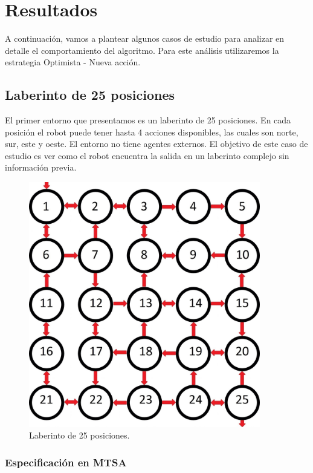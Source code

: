\chapter{Resultados}

A continuación, vamos a plantear algunos casos de estudio para analizar en detalle el comportamiento del algoritmo. 
Para este análisis utilizaremos la estrategia Optimista - Nueva acción.

\section{Laberinto de 25 posiciones}

El primer entorno que presentamos es un laberinto de 25 posiciones. En cada posición el robot puede tener hasta 4 
acciones disponibles, las cuales son norte, sur, este y oeste. El entorno no tiene agentes externos. El objetivo de 
este caso de estudio es ver como el robot encuentra la salida en un laberinto complejo sin información previa.

\begin{figure}[H]
	\centering
		\includegraphics[width=0.9\textwidth]{Imagenes/Laberintos/25.jpg}
	\caption{Laberinto de 25 posiciones.}
	\label{fig:25}
\end{figure}

\subsection{Especificación en MTSA}

